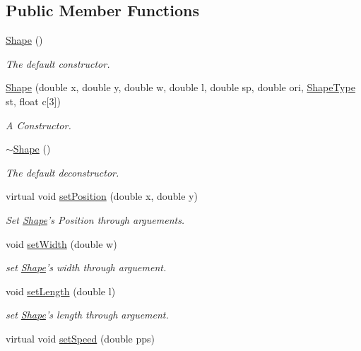 \subsection*{Public Member Functions}
\begin{DoxyCompactItemize}
\item 
\hyperlink{classShape_aaa8d87171e65e0d8ba3c5459978992a7}{Shape} ()
\begin{DoxyCompactList}\small\item\em The default constructor. \end{DoxyCompactList}\item 
\hyperlink{classShape_a0321daab69934d93bdbfa0043aa93d6f}{Shape} (double x, double y, double w, double l, double sp, double ori, \hyperlink{Shape_8h_a5a4538eeab397888d88a4eefcc5a1345}{Shape\-Type} st, float c\mbox{[}3\mbox{]})
\begin{DoxyCompactList}\small\item\em A Constructor. \end{DoxyCompactList}\item 
\hyperlink{classShape_a935afc9e576015f967d90de56977167d}{$\sim$\-Shape} ()
\begin{DoxyCompactList}\small\item\em The default deconstructor. \end{DoxyCompactList}\item 
virtual void \hyperlink{classShape_a341d3d37dc6612007affe1b397b689a7}{set\-Position} (double x, double y)
\begin{DoxyCompactList}\small\item\em Set \hyperlink{classShape}{Shape}'s Position through arguements. \end{DoxyCompactList}\item 
void \hyperlink{classShape_a3cff2a1f2501873af1c777bf120b9c9a}{set\-Width} (double w)
\begin{DoxyCompactList}\small\item\em set \hyperlink{classShape}{Shape}'s width through arguement. \end{DoxyCompactList}\item 
void \hyperlink{classShape_ae6391c6b6ed068c3f5a30ed15ffd5903}{set\-Length} (double l)
\begin{DoxyCompactList}\small\item\em set \hyperlink{classShape}{Shape}'s length through arguement. \end{DoxyCompactList}\item 
virtual void \hyperlink{classShape_a23976c8158461838dcbba68b118c9580}{set\-Speed} (double pps)

\end{DoxyCompactItemize}
